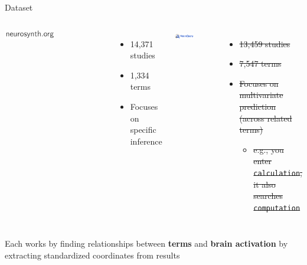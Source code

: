 \documentclass[aspectratio=169]{beamer}
\begin{document}
\begin{frame}{Dataset}

	\begin{columns}[t]
			\includegraphics[width=0.5\textwidth]{neurosynth}\cite{YarkoniEtAl2011}
			
			\begin{itemize}
				\item 14,371 studies
				\item 1,334 terms
				\item Focuses on specific inference
			\end{itemize}
			
			\includegraphics[width=0.5\textwidth]{neuroquery}\cite{DockesEtAl2020}
			
			\begin{itemize}
				\item \sout{13,459 studies}
				\item \sout{7,547 terms}
				\item \sout{Focuses on multivariate prediction (across related terms)}
				\begin{itemize}
					\item \sout{e.g., you enter \texttt{calculation}, it also searches \texttt{computation}}
				\end{itemize}
			\end{itemize}
	\end{columns}
	
	\begin{block}{}
				Each works by finding relationships between \textbf{terms} and \textbf{brain activation} by extracting standardized coordinates from results
	\end{block}
\end{frame}
\end{document}

